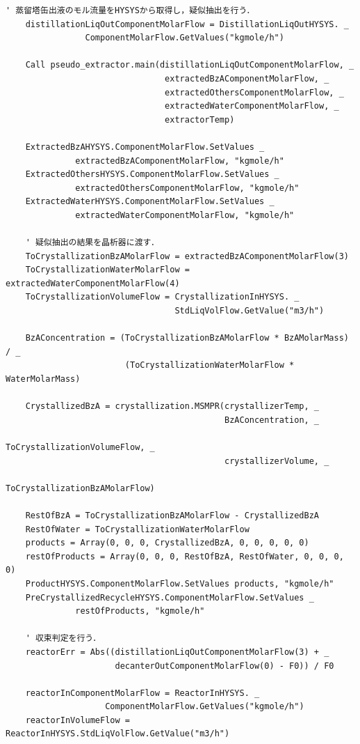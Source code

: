 \documentclass[a4j]{jsreport}
\begin{document}
\begin{lstlisting}[caption=HYSYSとpythonを繋ぐコード]
    ' 蒸留塔缶出液のモル流量をHYSYSから取得し，疑似抽出を行う．
    distillationLiqOutComponentMolarFlow = DistillationLiqOutHYSYS. _
                ComponentMolarFlow.GetValues("kgmole/h")

    Call pseudo_extractor.main(distillationLiqOutComponentMolarFlow, _
                                extractedBzAComponentMolarFlow, _
                                extractedOthersComponentMolarFlow, _
                                extractedWaterComponentMolarFlow, _
                                extractorTemp)

    ExtractedBzAHYSYS.ComponentMolarFlow.SetValues _
              extractedBzAComponentMolarFlow, "kgmole/h"
    ExtractedOthersHYSYS.ComponentMolarFlow.SetValues _
              extractedOthersComponentMolarFlow, "kgmole/h"
    ExtractedWaterHYSYS.ComponentMolarFlow.SetValues _
              extractedWaterComponentMolarFlow, "kgmole/h"

    ' 疑似抽出の結果を晶析器に渡す．
    ToCrystallizationBzAMolarFlow = extractedBzAComponentMolarFlow(3)
    ToCrystallizationWaterMolarFlow = extractedWaterComponentMolarFlow(4)
    ToCrystallizationVolumeFlow = CrystallizationInHYSYS. _
                                  StdLiqVolFlow.GetValue("m3/h")

    BzAConcentration = (ToCrystallizationBzAMolarFlow * BzAMolarMass) / _
                        (ToCrystallizationWaterMolarFlow * WaterMolarMass)

    CrystallizedBzA = crystallization.MSMPR(crystallizerTemp, _
                                            BzAConcentration, _
                                            ToCrystallizationVolumeFlow, _
                                            crystallizerVolume, _
                                            ToCrystallizationBzAMolarFlow)

    RestOfBzA = ToCrystallizationBzAMolarFlow - CrystallizedBzA
    RestOfWater = ToCrystallizationWaterMolarFlow
    products = Array(0, 0, 0, CrystallizedBzA, 0, 0, 0, 0, 0)
    restOfProducts = Array(0, 0, 0, RestOfBzA, RestOfWater, 0, 0, 0, 0)
    ProductHYSYS.ComponentMolarFlow.SetValues products, "kgmole/h"
    PreCrystallizedRecycleHYSYS.ComponentMolarFlow.SetValues _
              restOfProducts, "kgmole/h"

    ' 収束判定を行う．
    reactorErr = Abs((distillationLiqOutComponentMolarFlow(3) + _
                      decanterOutComponentMolarFlow(0) - F0)) / F0

    reactorInComponentMolarFlow = ReactorInHYSYS. _
                    ComponentMolarFlow.GetValues("kgmole/h")
    reactorInVolumeFlow = ReactorInHYSYS.StdLiqVolFlow.GetValue("m3/h")



\end{lstlisting}
\end{document}
